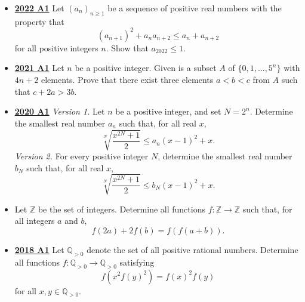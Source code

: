 \documentclass[11pt]{scrartcl}
\begin{document}
\begin{itemize}[leftmargin=*]
\item  \href{https://artofproblemsolving.com/community/c6h3107323p28104243}{\textbf{2022 A1}} Let $(a_n)_{n\geqslant  1}$ be a sequence of positive real numbers with the property that
$$(a_{n+1})^2 + a_na_{n+2} \leqslant a_n + a_{n+2}$$for all positive integers $n$. Show that $a_{2022}\leqslant 1$. 
\item \href{https://artofproblemsolving.com/community/c6h2882570p25627665}{\textbf{2021 A1}}	Let $n$ be a positive integer. Given is a subset $A$ of $\{0,1,\dots,5^n\}$ with $4n+2$ elements. Prove that there exist three elements $a<b<c$ from $A$ such that $c+2a>3b$.
\item \href{https://artofproblemsolving.com/community/c6h2625913p22698446}{\textbf{2020 A1}} \textit{Version 1.} Let $n$ be a positive integer, and set $N=2^{n}$. Determine the smallest real number $a_{n}$ such that, for all real $x$,
\[
\sqrt[N]{\frac{x^{2 N}+1}{2}} \leqslant a_{n}(x-1)^{2}+x .
\] 
\textit{Version 2.} For every positive integer $N$, determine the smallest real number $b_{N}$ such that, for all real $x$,
\[
\sqrt[N]{\frac{x^{2 N}+1}{2}} \leqslant b_{N}(x-1)^{2}+x .
\]

\item {}	Let $\mathbb{Z}$ be the set of integers. Determine all functions $f: \mathbb{Z} \rightarrow \mathbb{Z}$ such that, for all integers $a$ and $b$,$$f(2a)+2f(b)=f(f(a+b)).$$
\item \href{https://artofproblemsolving.com/community/c6h1876757p12752810}{\textbf{2018 A1}} Let $\mathbb{Q}_{>0}$ denote the set of all positive rational numbers. Determine all functions $f:\mathbb{Q}_{>0}\to \mathbb{Q}_{>0}$ satisfying$$f(x^2f(y)^2)=f(x)^2f(y)$$for all $x,y\in\mathbb{Q}_{>0}$.


\end{itemize}
\end{document}
